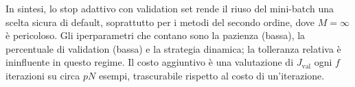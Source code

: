 In sintesi, lo stop adattivo con validation set rende il riuso del
mini-batch una scelta sicura di default, soprattutto per i metodi del
secondo ordine, dove $M=\infty$ è pericoloso. Gli iperparametri che contano
sono la pazienza (bassa), la percentuale di validation (bassa) e la
strategia dinamica; la tolleranza relativa è ininfluente in questo regime.
Il costo aggiuntivo è una valutazione di $J_{\mathrm{val}}$ ogni $f$
iterazioni su circa $pN$ esempi, trascurabile rispetto al costo di
un'iterazione.



